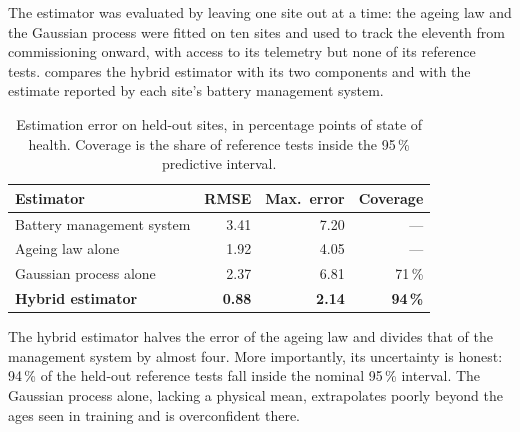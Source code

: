 The estimator was evaluated by leaving one site out at a time: the
ageing law and the Gaussian process were fitted on ten sites and used to
track the eleventh from commissioning onward, with access to its
telemetry but none of its reference tests.  compares
the hybrid estimator with its two components and with the estimate
reported by each site's battery management system.

\begin{table}[tb]
  \caption[Estimation error on held-out sites]{Estimation error on
    held-out sites, in percentage points of state of health. Coverage is
    the share of reference tests inside the 95\,\% predictive interval.}
  \label{tab:errors}
  \centering
  \begin{tabular}{@{}l r r r@{}}
    \toprule
    Estimator & RMSE & Max.\ error & Coverage \\
    \midrule
    Battery management system  & 3.41 & 7.20 & --- \\
    Ageing law alone           & 1.92 & 4.05 & --- \\
    Gaussian process alone     & 2.37 & 6.81 & 71\,\% \\
    \textbf{Hybrid estimator}  & \textbf{0.88} & \textbf{2.14} & \textbf{94\,\%} \\
    \bottomrule
  \end{tabular}
\end{table}

The hybrid estimator halves the error of the ageing law and divides that
of the management system by almost four. More importantly, its
uncertainty is honest: 94\,\% of the held-out reference tests fall inside
the nominal 95\,\% interval. The Gaussian process alone, lacking a
physical mean, extrapolates poorly beyond the ages seen in training and
is overconfident there.

